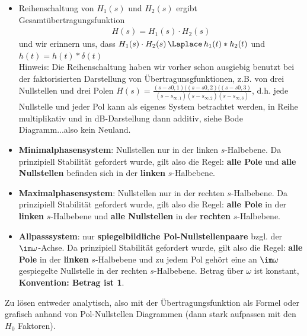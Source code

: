 \begin{Werkzeug}
\begin{itemize}
  \item Reihenschaltung von $H_1(s)$ und $H_2(s)$ ergibt Gesamtübertragungsfunktion
  \begin{align}
    H(s) = H_1(s) \cdot H_2(s)
  \end{align}
  und wir erinnern uns, dass $H_1(s)\cdot H_2(s) \,\Laplace\, h_1(t)\ast h_2(t)$
  und $h(t) = h(t)\ast \delta(t)$\\
  Hinweis: Die Reihenschaltung haben wir vorher schon ausgiebig benutzt bei der faktorisierten
  Darstellung von Übertragunsgfunktionen, z.B. von drei Nullstellen und drei Polen
  $H(s) = \frac{(s-s{0,1})((s-s{0,2})((s-s{0,3})}{(s-s_{\infty,1})(s-s_{\infty,2})(s-s_{\infty,3})}$,
  d.h. jede Nullstelle und jeder Pol kann als eigenes System betrachtet werden, in Reihe
  multiplikativ und in dB-Darstellung dann additiv, siehe Bode Diagramm...also kein
  Neuland.
  \item \textbf{Minimalphasensystem}: Nullstellen nur in der linken $s$-Halbebene. Da prinzipiell
  Stabilität gefordert wurde, gilt also die Regel: \textbf{alle Pole} und \textbf{alle Nullstellen}
  befinden sich in der \textbf{linken} $s$-Halbebene.
  \item \textbf{Maximalphasensystem}: Nullstellen nur in der rechten $s$-Halbebene. Da prinzipiell
  Stabilität gefordert wurde, gilt also die Regel: \textbf{alle Pole} in der \textbf{linken}
  $s$-Halbebene und \textbf{alle Nullstellen} in der \textbf{rechten} $s$-Halbebene.
  \item \textbf{Allpasssystem}: nur \textbf{spiegelbildliche Pol-Nullstellenpaare} bzgl.
  der $\im\omega$-Achse. Da prinzipiell Stabilität gefordert wurde, gilt also
  die Regel: \textbf{alle Pole} in der \textbf{linken} $s$-Halbebene und zu jedem Pol gehört
  eine an $\im\omega$ gespiegelte Nullstelle in der rechten $s$-Halbebene.
  Betrag über $\omega$ ist konstant, \textbf{Konvention: Betrag ist 1}.
\end{itemize}


\end{Werkzeug}
\begin{Ansatz}
Zu lösen entweder analytisch, also mit der Übertragungsfunktion als Formel
oder grafisch anhand von Pol-Nullstellen Diagrammen (dann stark aufpassen
mit den $H_0$ Faktoren).
\end{Ansatz}

